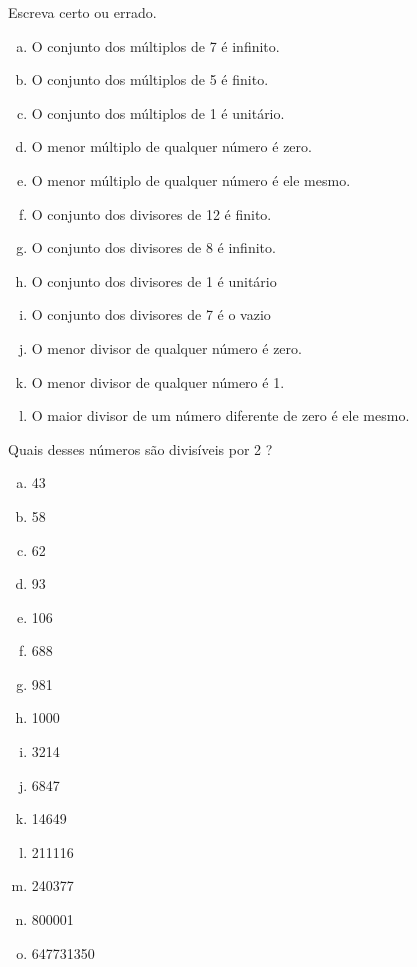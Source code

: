 \item Escreva certo ou errado.
\begin{enumerate}[a)]
\item O conjunto dos múltiplos de 7 é infinito.
\item O conjunto dos múltiplos de 5 é finito.
\item O conjunto dos múltiplos de 1 é unitário.
\item O menor múltiplo de qualquer número é zero.
\item O menor múltiplo de qualquer número é ele mesmo.
\item O conjunto  dos divisores de 12 é finito.
\item O conjunto dos divisores de 8 é infinito.
\item O conjunto dos divisores de 1 é unitário
\item O conjunto dos divisores de 7 é o vazio
\item O menor divisor de qualquer número é zero.
\item O menor divisor de qualquer número é 1.
\item O maior divisor de um número diferente de zero é ele mesmo.
\end{enumerate}

\item  Quais desses números são divisíveis por 2 ?
\begin{multicols}{5}
\begin{enumerate}[a)]
	\item 43
	\item 58
	\item 62
	\item 93
	\item 106
	\item 688
	\item 981
	\item 1000
	\item 3214
	\item 6847
	\item 14649
	\item 211116
	\item 240377
	\item 800001
	\item 647731350
\end{enumerate}
\end{multicols}

